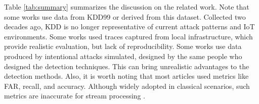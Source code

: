 Table \ref{tab:summary} summarizes the discussion on the related work.
Note that some works use data from KDD99 or derived from this dataset. Collected two decades ago, KDD is no longer representative of current attack patterns and IoT environments.
Some works used traces captured from local infrastructure, which provide realistic evaluation, but lack of reproducibility.
Some works use data produced by intentional attacks simulated, designed by the same people who designed the detection techniques. This can bring unrealistic advantages to the detection methods.
Also, it is worth noting that most articles used metrics like FAR, recall, and accuracy. Although widely adopted in classical scenarios, such metrics are inaccurate for stream processing  \cite{GAMA2010}.


